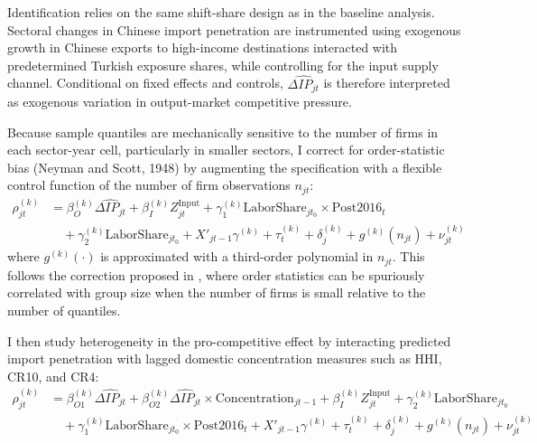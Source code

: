 ﻿\documentclass[12pt]{article}
\begin{document}
Identification relies on the same shift-share design as in the baseline analysis. Sectoral changes in Chinese import penetration are instrumented using exogenous growth in Chinese exports to high-income destinations interacted with predetermined Turkish exposure shares, while controlling for the input supply channel. Conditional on fixed effects and controls, $\widehat{\Delta IP_{jt}}$ is therefore interpreted as exogenous variation in output-market competitive pressure. 

Because sample quantiles are mechanically sensitive to the number of firms in each sector-year cell, particularly in smaller sectors, I correct for order-statistic bias (Neyman and Scott, 1948) by augmenting the specification with a flexible control function of the number of firm observations $n_{jt}$:
\begin{equation}
\begin{aligned}
\rho_{jt}^{(k)} &= \beta_O^{(k)} \widehat{\Delta IP_{jt}} + \beta_I^{(k)} Z_{jt}^{\text{Input}} + \gamma_1^{(k)} \text{LaborShare}_{jt_0} \times \text{Post2016}_t \\
&\quad + \gamma_2^{(k)} \text{LaborShare}_{jt_0} + X'_{jt-1} \gamma^{(k)} + \tau_t^{(k)} + \delta_j^{(k)} + g^{(k)}(n_{jt}) + \nu_{jt}^{(k)}
\end{aligned}
\end{equation}
where $g^{(k)}(\cdot)$ is approximated with a third-order polynomial in $n_{jt}$. This follows the correction proposed in \textcite{backusWhyProductivityCorrelated2020}, where order statistics can be spuriously correlated with group size when the number of firms is small relative to the number of quantiles.

I then study heterogeneity in the pro-competitive effect by interacting predicted import penetration with lagged domestic concentration measures such as HHI, CR10, and CR4:
\begin{equation}
\begin{aligned}
\rho_{jt}^{(k)} &= \beta_{O1}^{(k)} \widehat{\Delta IP_{jt}} + \beta_{O2}^{(k)} \widehat{\Delta IP_{jt}} \times \text{Concentration}_{jt-1} + \beta_I^{(k)} Z_{jt}^{\text{Input}}  + \gamma_2^{(k)} \text{LaborShare}_{jt_0} \\
&\quad + \gamma_1^{(k)} \text{LaborShare}_{jt_0} \times \text{Post2016}_t + X'_{jt-1} \gamma^{(k)} + \tau_t^{(k)} + \delta_j^{(k)} + g^{(k)}(n_{jt}) + \nu_{jt}^{(k)}
\end{aligned}
\end{equation}
\end{document}
